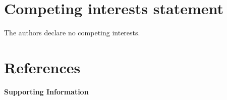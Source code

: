 \documentclass[aip,reprint]{revtex4-1}
\begin{document}
\section*{Competing interests statement}
    The authors declare no competing interests.

\section*{References}

% 

\setcounter{section}{0}
\renewcommand{\thesection}{S\arabic{section}}
\setcounter{equation}{0}
\renewcommand{\theequation}{S\arabic{equation}}
\setcounter{figure}{0}
\renewcommand{\thefigure}{S\arabic{figure}}
\setcounter{table}{0}
\renewcommand{\thetable}{S\arabic{table}}
    
\clearpage
\onecolumngrid

{\Large\normalfont\sffamily\bfseries{{Supporting Information}}}

\setlength{\tabcolsep}{18pt}
\renewcommand{\arraystretch}{1.2}


\end{document}
